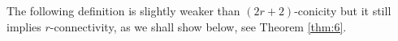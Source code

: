 \documentclass[11pt,twoside, reqno]{amsart}
\theoremstyle{plain}
\newtheorem{teo}[lema]{Theorem}
\theoremstyle{definition}
\newcommand{\TC}{\textrm{TC}}
\newcommand{\st}{\textrm{st}}
\begin{document}









The following definition is slightly weaker than $(2r+2)$-conicity but it still implies $r$-connectivity, as we shall show below, see Theorem \ref{thm:6}. 

\end{document}
